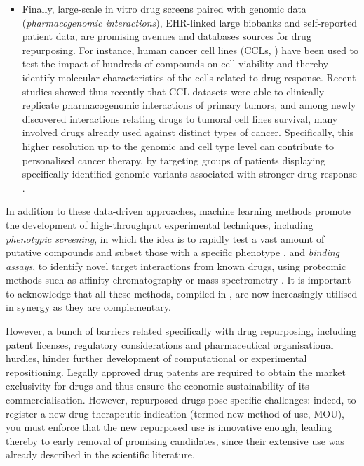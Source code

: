 \begin{itemize}
\item Finally, large-scale in vitro drug screens paired with genomic data (\emph{pharmacogenomic interactions}), EHR-linked large biobanks and self-reported patient data, are promising avenues and databases sources for drug repurposing. For instance, human cancer cell lines (CCLs, \autocite{huang_vakoc16}) have been used to test the impact of hundreds of compounds on cell viability and thereby identify molecular characteristics of the cells related to drug response. Recent studies showed thus recently that CCL datasets were able to clinically replicate pharmacogenomic interactions of primary tumors, and among newly discovered interactions relating drugs to tumoral cell lines survival, many involved drugs already used against distinct types of cancer. Specifically, this higher resolution up to the genomic and cell type level can contribute to personalised cancer therapy, by targeting groups of patients displaying specifically identified genomic variants associated with stronger drug response \autocite{iorio_etal16}.
\end{itemize}

In addition to these data-driven approaches, machine learning methods promote the development of high-throughput experimental techniques, including \emph{phenotypic screening}, in which the idea is to rapidly test a vast amount of putative compounds and subset those with a specific phenotype \autocite{iljin_etal09}, and \emph{binding assays}, to identify novel target interactions from known drugs, using proteomic methods such as affinity chromatography or mass spectrometry \autocite{alshareef_etal16}. It is important to acknowledge that all these methods, compiled in , are now increasingly utilised in synergy as they are complementary.


However, a bunch of barriers related specifically with drug repurposing, including patent licenses, regulatory considerations and pharmaceutical organisational hurdles, hinder further development of computational or experimental repositioning. Legally approved drug patents are required to obtain the market exclusivity for drugs and thus ensure the economic sustainability of its commercialisation. However, repurposed drugs pose specific challenges: indeed, to register a new drug therapeutic indication (termed new method-of-use, MOU), you must enforce that the new repurposed use is innovative enough, leading thereby to early removal of promising candidates, since their extensive use was already described in the scientific literature.

